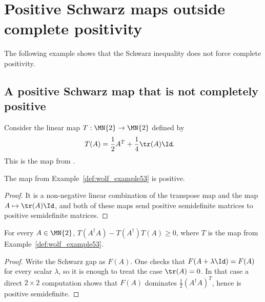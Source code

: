 \section{Positive Schwarz maps outside complete positivity}

The following example shows that the Schwarz inequality does not force complete
positivity.

\subsection{A positive Schwarz map that is not completely positive}

\begin{example}\label{def:wolf_example53}
    \leanok
    Consider the linear map $T : \MN{2} \to \MN{2}$ defined by
    \begin{align}
        T(A) & =\frac{1}{2} A^T+\frac{1}{4}\tr(A)\Id.
        \notag
    \end{align}
    This is the map from \cite[Example~5.3]{Wolf2012Quantum}.
\end{example}

\begin{theorem}\label{thm:wolf_example53_positive}
    \leanok
    The map from Example~\ref{def:wolf_example53} is positive.
\end{theorem}

\begin{proof}
    \leanok
    It is a non-negative linear combination of the transpose map and the map
    $A \mapsto \tr(A) \Id$, and both of these maps send positive
    semidefinite matrices to positive semidefinite matrices.
\end{proof}

\begin{theorem}\label{thm:wolf_example53_schwarz}
    \leanok
    For every $A \in \MN{2}$,
    $T(A^\dagger A)-T(A^\dagger)T(A)\ge 0$, where $T$ is the map from
    Example~\ref{def:wolf_example53}.
\end{theorem}

\begin{proof}
    \leanok
    Write the Schwarz gap as $F(A)$.
    One checks that $F(A + \lambda \Id) = F(A)$ for every scalar $\lambda$,
    so it is enough to treat the case $\tr(A) = 0$.
    In that case a direct $2 \times 2$ computation shows that
    $F(A)$ dominates $\frac{1}{2} (A^\dagger A)^T$, hence is positive semidefinite.
\end{proof}


